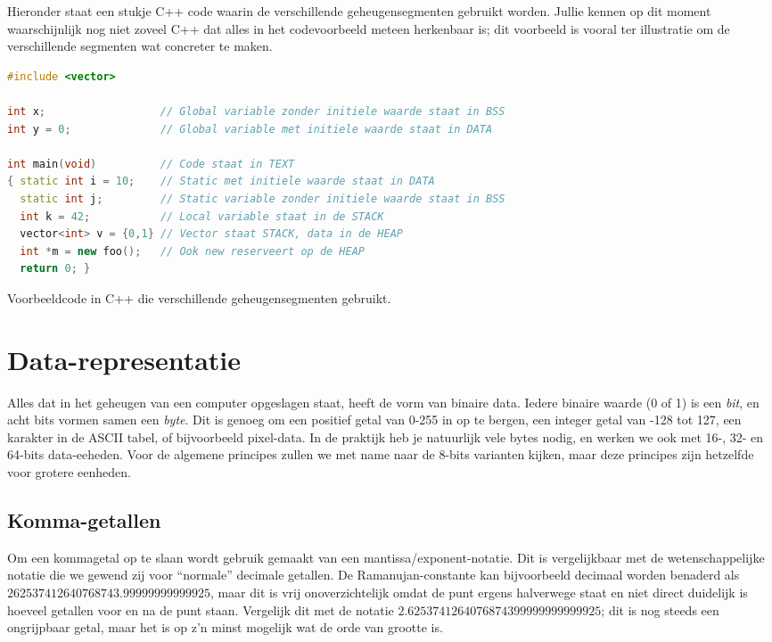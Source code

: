 Hieronder staat een stukje C++ code waarin de verschillende geheugensegmenten gebruikt worden. Jullie kennen op dit moment waarschijnlijk nog niet zoveel C++ dat alles in het codevoorbeeld meteen herkenbaar is; dit voorbeeld is vooral ter illustratie om de verschillende segmenten wat concreter te maken.

\begin{listing}
\begin{lstlisting}[language=c++]
#include <vector>

int x;                  // Global variable zonder initiele waarde staat in BSS
int y = 0;              // Global variable met initiele waarde staat in DATA

int main(void)          // Code staat in TEXT
{ static int i = 10;    // Static met initiele waarde staat in DATA
  static int j;         // Static variable zonder initiele waarde staat in BSS
  int k = 42;           // Local variable staat in de STACK
  vector<int> v = {0,1} // Vector staat STACK, data in de HEAP
  int *m = new foo();   // Ook new reserveert op de HEAP
  return 0; }
\end{lstlisting}
\caption{Voorbeeldcode in C++ die verschillende geheugensegmenten gebruikt.}
\end{listing}

\section{Data-representatie}
Alles dat in het geheugen van een computer opgeslagen staat, heeft de vorm van binaire data. Iedere binaire waarde (0 of 1) is een \emph{bit}, en acht bits vormen samen een \emph{byte}. Dit is genoeg om een positief getal van 0-255 in op te bergen, een integer getal van -128 tot 127, een karakter in de ASCII tabel, of bijvoorbeeld pixel-data. In de praktijk heb je natuurlijk vele bytes nodig, en werken we ook met 16-, 32- en 64-bits data-eeheden. Voor de algemene principes zullen we met name naar de 8-bits varianten kijken, maar deze principes zijn hetzelfde voor grotere eenheden.


\subsection{Komma-getallen}
Om een kommagetal op te slaan wordt gebruik gemaakt van een mantissa/exponent-notatie. Dit is vergelijkbaar met de wetenschappelijke notatie die we gewend zij voor \enquote{normale} decimale getallen. De Ramanujan-constante kan bijvoorbeeld decimaal worden benaderd als $262537412640768743.99999999999925$, maar dit is vrij onoverzichtelijk omdat de punt ergens halverwege staat en niet direct duidelijk is hoeveel getallen voor en na de punt staan. Vergelijk dit met de notatie $2.6253741264076874399999999999925$; dit is nog steeds een ongrijpbaar getal, maar het is op z'n minst mogelijk wat de orde van grootte is.

